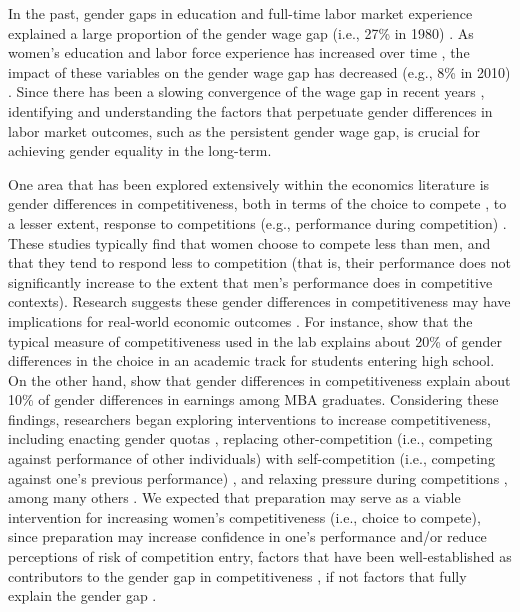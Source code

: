 \documentclass[letterpaper, nobind]{templates/ociamthesis}
\begin{document}
In the past, gender gaps in education and full-time labor market experience explained a large proportion of the gender wage gap (i.e., 27\% in 1980) \autocite{Blau2017}. As women's education and labor force experience has increased over time \autocite{Goldin2006a}, the impact of these variables on the gender wage gap has decreased (e.g., 8\% in 2010) \autocite{Blau2017}. Since there has been a slowing convergence of the wage gap in recent years \autocite{Blau2006b}, identifying and understanding the factors that perpetuate gender differences in labor market outcomes, such as the persistent gender wage gap, is crucial for achieving gender equality in the long-term.

One area that has been explored extensively within the economics literature is gender differences in competitiveness, both in terms of the choice to compete \autocites[for review, see][]{Niederle2011,Niederle2017a}, to a lesser extent, response to competitions (e.g., performance during competition) \autocite{Gneezy2003,Gneezy2004,Gunther2010,Samak2013}. These studies typically find that women choose to compete less than men, and that they tend to respond less to competition (that is, their performance does not significantly increase to the extent that men's performance does in competitive contexts). Research suggests these gender differences in competitiveness may have implications for real-world economic outcomes \autocite{Buser2014,Zhang2012,Buser2017c,Buser2017b,Samek2019,Berge2015,Reuben2015,Reuben2017}. For instance, \textcite{Buser2014} show that the typical measure of competitiveness used in the lab explains about 20\% of gender differences in the choice in an academic track for students entering high school. On the other hand, \textcite{Reuben2015} show that gender differences in competitiveness explain about 10\% of gender differences in earnings among MBA graduates. Considering these findings, researchers began exploring interventions to increase competitiveness, including enacting gender quotas \autocite{Niederle2013,Sutter2016}, replacing other-competition (i.e., competing against performance of other individuals) with self-competition (i.e., competing against one's previous performance) \autocite{Bonte2018,Carpenter2018,Klinowski2019,Apicella2017a,Apicella2020}, and relaxing pressure during competitions \autocite{Shurchkov2012}, among many others \autocite[see][ for a review]{Niederle2017a}. We expected that preparation may serve as a viable intervention for increasing women's competitiveness (i.e., choice to compete), since preparation may increase confidence in one's performance and/or reduce perceptions of risk of competition entry, factors that have been well-established as contributors to the gender gap in competitiveness \autocite{Niederle2011}, if not factors that fully explain the gender gap \autocite{Veldhuizen2017,Gillen2019}.
\end{document}
